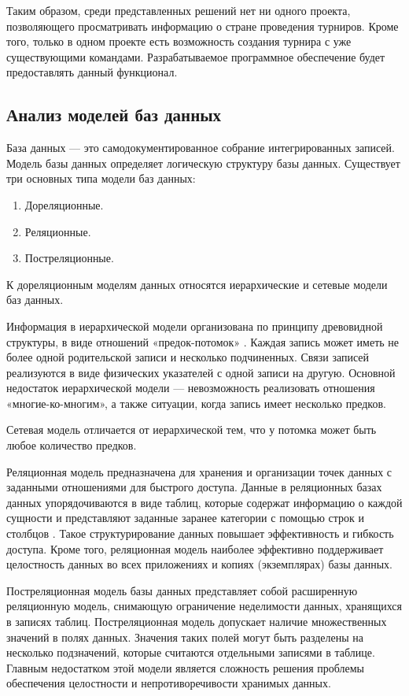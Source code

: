 Таким образом, среди представленных решений нет ни одного проекта, позволяющего просматривать информацию о стране проведения турниров. Кроме того, только в одном проекте есть возможность создания турнира с уже существующими командами. Разрабатываемое программное обеспечение будет предоставлять данный функционал.

\subsection{Анализ моделей баз данных}

База данных --- это самодокументированное собрание интегрированных записей. Модель базы данных определяет логическую структуру базы данных. Существует три основных типа модели баз данных:
\begin{enumerate}
    \item Дореляционные.
    \item Реляционные.
    \item Постреляционные.
\end{enumerate}

К дореляционным моделям данных относятся иерархические и сетевые модели баз данных.

Информация в иерархической модели организована по принципу древовидной структуры, в виде отношений «предок-потомок» \cite{ierar}. Каждая запись может иметь не более одной родительской записи и несколько подчиненных. Связи записей реализуются в виде физических указателей с одной записи на другую. Основной недостаток иерархической модели — невозможность реализовать отношения «многие-ко-многим», а также ситуации, когда запись имеет несколько предков.

Сетевая модель отличается от иерархической тем, что у потомка может быть любое количество предков.

Реляционная модель предназначена для хранения и организации точек данных с заданными отношениями для быстрого доступа. Данные в реляционных базах данных упорядочиваются в виде таблиц, которые содержат информацию о каждой сущности и представляют заданные заранее категории с помощью строк и столбцов \cite{relat}. Такое структурирование данных повышает эффективность и гибкость доступа. Кроме того, реляционная модель наиболее эффективно поддерживает целостность данных во всех приложениях и копиях (экземплярах) базы данных. 

Постреляционная модель базы данных представляет собой расширенную реляционную модель, снимающую ограничение неделимости данных, хранящихся в записях таблиц. Постреляционная модель допускает наличие множественных значений в полях данных. Значения таких полей могут быть разделены на несколько подзначений, которые считаются отдельными записями в таблице. Главным недостатком этой модели является сложность решения проблемы обеспечения целостности и непротиворечивости хранимых данных.

